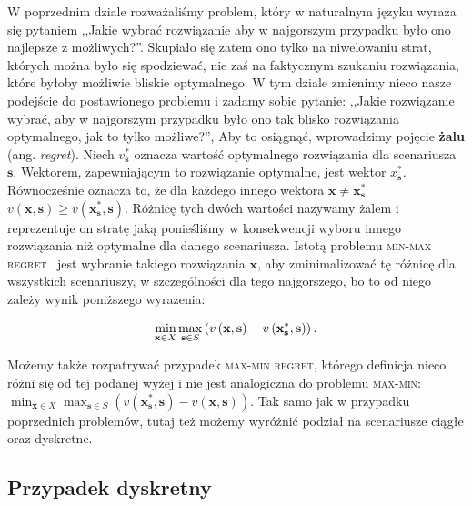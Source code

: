 W poprzednim dziale rozważaliśmy problem, który w naturalnym języku wyraża się pytaniem ,,Jakie wybrać rozwiązanie aby w najgorszym przypadku było ono najlepsze z możliwych?''. Skupiało się zatem ono tylko na niwelowaniu strat, których można było się spodziewać, nie zaś na faktycznym szukaniu rozwiązania, które byłoby możliwie bliskie optymalnego. W tym dziale zmienimy nieco nasze podejście do postawionego problemu i zadamy sobie pytanie: ,,Jakie rozwiązanie wybrać, aby w najgorszym przypadku było ono tak blisko rozwiązania optymalnego, jak to tylko możliwe?'', Aby to osiągnąć, wprowadzimy pojęcie \textbf{żalu} (ang. \textit{regret}). Niech $v_{\textbf{s}}^{\ast}$ oznacza wartość optymalnego rozwiązania dla scenariusza $\textbf{s}$. Wektorem, zapewniającym to rozwiązanie optymalne, jest wektor $x^{\ast}_{\textbf{s}}$. Równocześnie oznacza to, że dla każdego innego wektora $\textbf{x} \neq \textbf{x}^{\ast}_{\textbf{s}}$ $v \left( \textbf{x}, \textbf{s} \right) \geqslant v \left( \textbf{x}^{\ast}_{\textbf{s}}, \textbf{s} \right)$. Różnicę tych dwóch wartości nazywamy żalem i reprezentuje on stratę jaką ponieśliśmy w konsekwencji wyboru innego rozwiązania niż optymalne dla danego scenariusza. Istotą problemu \textsc{min-max regret}~\cite[$595$]
{Kasperski2012} jest wybranie takiego rozwiązania $\textbf{x}$, aby zminimalizować tę różnicę dla wszystkich scenariuszy, w szczególności dla tego najgorszego, bo to od niego zależy wynik poniższego wyrażenia:

\begin{equation}
	\min_{\mathclap{\textbf{x} \in X}} \max_{\mathclap{\textbf{s} \in S}} \left( v \left( \textbf{x}, \textbf{s} \right) - v \left( \textbf{x}^{\ast}_{\textbf{s}}, \textbf{s} \right) \right)\text{.}
\end{equation}

Możemy także rozpatrywać przypadek \textsc{max-min regret}, którego definicja nieco różni się od tej podanej wyżej i nie jest analogiczna do problemu \textsc{max-min}: $\min_{\textbf{x} \in X} \max_{\textbf{s} \in S} \left( v \left( \textbf{x}^{\ast}_{\textbf{s}}, \textbf{s} \right) - v \left( \textbf{x}, \textbf{s} \right) \right)$. Tak samo jak w przypadku poprzednich problemów, tutaj też możemy wyróżnić podział na scenariusze ciągłe oraz dyskretne.

\subsection{Przypadek dyskretny}

